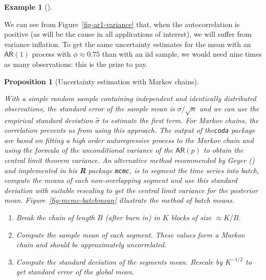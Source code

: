\documentclass[
  11pt,
  letterpaper,
]{scrbook}
\providecommand{\tightlist}{%
  \setlength{\itemsep}{0pt}\setlength{\parskip}{0pt}}\usepackage{longtable,booktabs,array}
\theoremstyle{definition}
\theoremstyle{plain}
\theoremstyle{plain}
\newtheorem{proposition}{Proposition}[chapter]
\theoremstyle{definition}
\theoremstyle{definition}
\newtheorem{example}{Example}[chapter]
\theoremstyle{remark}
\begin{document}
\begin{example}[]
\begin{figure}[ht!]
\end{figure}%

We can see from Figure~\ref{fig-ar1-variance} that, when the
autocorrelation is positive (as will be the cause in all applications of
interest), we will suffer from variance inflation. To get the same
uncertainty estimates for the mean with an \(\mathsf{AR}(1)\) process
with \(\phi \approx 0.75\) than with an iid sample, we would need nine
times as many observations: this is the prize to pay.

\end{example}

\begin{proposition}[Uncertainty estimation with Markov
chains]\protect\hypertarget{prp-uncertainty}{}\label{prp-uncertainty}

With a simple random sample containing independent and identically
distributed observations, the standard error of the sample mean is
\(\sigma/\sqrt{n}\) and we can use the empirical standard deviation
\(\widehat{\sigma}\) to estimate the first term. For Markov chains, the
correlation prevents us from using this approach. The output of
the\texttt{coda} package are based on fitting a high order
autoregressive process to the Markov chain and using the formula of the
unconditional variance of the \(\mathsf{AR}(p)\) to obtain the central
limit theorem variance. An alternative method recommended by Geyer
() and implemented in his \textbf{R}
package \texttt{mcmc}, is to segment the time series into batch, compute
the means of each non-overlapping segment and use this standard
deviation with suitable rescaling to get the central limit variance for
the posterior mean. Figure~\ref{fig-mcmc-batchmean} illustrate the
method of batch means.

\begin{enumerate}
\def\labelenumi{\arabic{enumi}.}
\tightlist
\item
  Break the chain of length \(B\) (after burn in) in \(K\) blocks of
  size \(\approx K/B.\)
\item
  Compute the sample mean of each segment. These values form a Markov
  chain and should be approximately uncorrelated.
\item
  Compute the standard deviation of the segments mean. Rescale by
  \(K^{-1/2}\) to get standard error of the global mean.
\end{enumerate}

\end{proposition}
\end{document}
